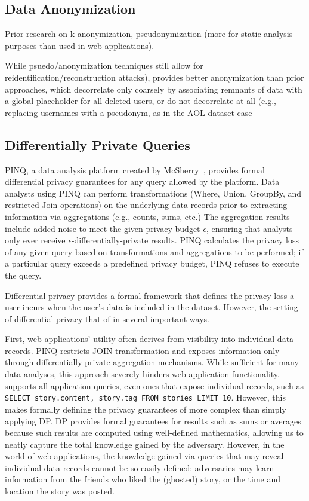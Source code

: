 \subsection{Data Anonymization}

Prior research on k-anonymization, pseudonymization (more for static analysis purposes than used in
web applications).

While psuedo/anonymization
techniques still allow for reidentification/reconstruction attacks), \name provides better
anonymization than prior approaches, which decorrelate only coarsely by associating remnants of data
with a global placeholder for all deleted users, or do not decorrelate at all (e.g., replacing
usernames with a pseudonym, as in the AOL dataset case~%

\subsection{Differentially Private Queries}

PINQ, a data analysis platform created by McSherry~\cite{pinq}, provides formal differential privacy
guarantees for any query allowed by the platform.  Data analysts using PINQ can perform
transformations (Where, Union, GroupBy, and restricted Join operations) on the underlying data
records prior to extracting information via aggregations (e.g., counts, sums, etc.) The aggregation
results include added noise to meet the given privacy budget $\epsilon$, ensuring that analysts only
ever receive $\epsilon$-differentially-private results.  PINQ calculates the privacy loss of any
given query based on transformations and aggregations to be performed; if a particular query exceeds
a predefined privacy budget, PINQ refuses to execute the query.

Differential privacy provides a formal framework that defines the privacy loss a user incurs
when the user's data is included in the dataset. However, the setting of differential privacy
that of \name in several important ways.

First, web applications' utility often derives from visibility into individual data records. PINQ
restricts JOIN transformation and exposes information only through differentially-private
aggregation mechanisms. While sufficient for many data analyses, this approach severely hinders web
application functionality. \name supports all application queries, even ones that expose individual
records, such as \texttt{SELECT story.content, story.tag FROM stories LIMIT 10}.
However, this makes formally defining the privacy guarantees of \name more complex than
simply applying DP.  DP provides formal guarantees for results such as sums or averages because such
results are computed using well-defined mathematics, allowing us to neatly capture the total
knowledge gained by the adversary. However, in the world of web applications, the knowledge gained
via queries that may reveal individual data records cannot be so easily defined: adversaries may
learn information from the friends who liked the (ghosted) story, or the time and location the story
was posted.

